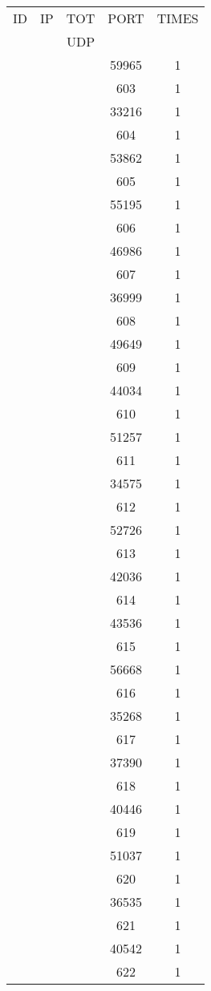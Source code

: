 \documentclass[a4paper]{scrartcl}
\begin{document}
\begin{minipage}[b]{0.5\linewidth}
\begin{tabular}{| c | c | c | c | c |}
\hline
ID & IP & TOT & PORT & TIMES \\ 
   &    & UDP &      &       \\ 
\hline
& & & 59965 & 1 \\ & & & 603 & 1 \\ & & & 33216 & 1 \\ & & & 604 & 1 \\ & & & 53862 & 1 \\ & & & 605 & 1 \\ & & & 55195 & 1 \\ & & & 606 & 1 \\ & & & 46986 & 1 \\ & & & 607 & 1 \\ & & & 36999 & 1 \\ & & & 608 & 1 \\ & & & 49649 & 1 \\ & & & 609 & 1 \\ & & & 44034 & 1 \\ & & & 610 & 1 \\ & & & 51257 & 1 \\ & & & 611 & 1 \\ & & & 34575 & 1 \\ & & & 612 & 1 \\ & & & 52726 & 1 \\ & & & 613 & 1 \\ & & & 42036 & 1 \\ & & & 614 & 1 \\ & & & 43536 & 1 \\ & & & 615 & 1 \\ & & & 56668 & 1 \\ & & & 616 & 1 \\ & & & 35268 & 1 \\ & & & 617 & 1 \\ & & & 37390 & 1 \\ & & & 618 & 1 \\ & & & 40446 & 1 \\ & & & 619 & 1 \\ & & & 51037 & 1 \\ & & & 620 & 1 \\ & & & 36535 & 1 \\ & & & 621 & 1 \\ & & & 40542 & 1 \\ & & & 622 & 1 \\ \hline\end{tabular}\end{minipage} \hfill\begin{minipage}[b]{0.5\linewidth}\begin{tabular}{| c | c | c | c | c |}

\end{tabular}
\end{minipage}
\end{document}
